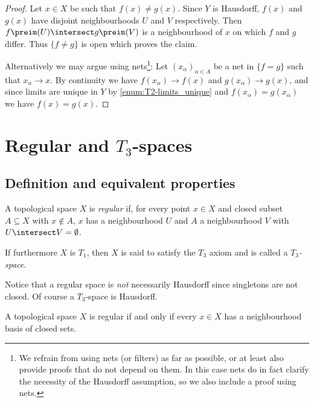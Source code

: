 \documentclass[article, a4paper, 11pt, oneside]{memoir}
\numberwithin{equation}{chapter}
\begin{document}
\begin{proof}
    Let $x \in X$ be such that $f(x) \neq g(x)$. Since $Y$ is Hausdorff, $f(x)$ and $g(x)$ have disjoint neighbourhoods $U$ and $V$ respectively. Then $f\preim(U) \intersect g\preim(V)$ is a neighbourhood of $x$ on which $f$ and $g$ differ. Thus $\{f \neq g\}$ is open which proves the claim.

    Alternatively we may argue using nets\footnote{We refrain from using nets (or filters) as far as possible, or at least also provide proofs that do not depend on them. In this case nets do in fact clarify the necessity of the Hausdorff assumption, so we also include a proof using nets.}: Let $(x_\alpha)_{\alpha \in A}$ be a net in $\{f = g\}$ such that $x_\alpha \to x$. By continuity we have $f(x_\alpha) \to f(x)$ and $g(x_\alpha) \to g(x)$, and since limits are unique in $Y$ by \cref{enum:T2-limits_unique} and $f(x_\alpha) = g(x_\alpha)$ we have $f(x) = g(x)$.
\end{proof}



\chapter[Regular and T3-spaces][Regular and $T_3$-spaces]{Regular and $T_3$-spaces}

\section{Definition and equivalent properties}

\begin{definition}
    A topological space $X$ is \emph{regular} if, for every point $x \in X$ and closed subset $A \subseteq X$ with $x \not\in A$, $x$ has a neighbourhood $U$ and $A$ a neighbourhood $V$ with $U \intersect V = \emptyset$.

    If furthermore $X$ is $T_1$, then $X$ is said to satisfy the $T_3$ axiom and is called a \emph{$T_3$-space}.
\end{definition}
%
Notice that a regular space is \emph{not} necessarily Hausdorff since singletons are not closed. Of course a $T_3$-space is Hausdorff.


\begin{proposition}
    \label{thm:regular-equivalent-properties}
    A topological space $X$ is regular if and only if every $x \in X$ has a neighbourhood basis of closed sets.
\end{proposition}
\end{document}
